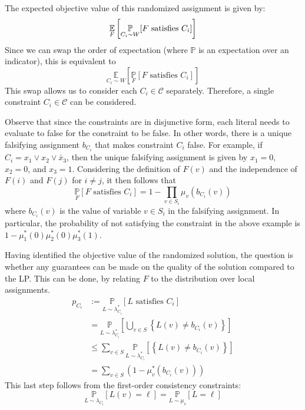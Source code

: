 The expected objective value of this randomized assignment is given by:
\[
	\underset{F}{\mathbb{E}}\left[ \underset{C_i \sim W}{\mathbb{P}}[ F \text{ satisfies } C_i] \right]
\]
Since we can swap the order of expectation (where $\mathbb{P}$ is an expectation over an indicator), this is equivalent to
\[
\underset{C_i \sim W}{\mathbb{E}}\left[ \underset{F}{\mathbb{P}}[ F \text{ satisfies } C_i] \right]
\]
This swap allows us to consider each $C_i \in \mathcal{C}$ separately. 
Therefore, a single constraint $C_i \in \mathcal{C}$ can be considered.

Observe that since the constraints are in disjunctive form, each literal needs to evaluate to false for the constraint to be false. 
In other words, there is a unique falsifying assignment $b_{C_i}$ that makes constraint $C_i$ false. 
For example, if $C_i = x_1 \vee x_2 \vee \bar{x}_3$, then the unique falsifying assignment is given by $x_1 = 0$, $x_2 = 0$, and $x_3 = 1$. 
Considering the definition of $F(v)$ and the independence of $F(i)$ and $F(j)$ for $i \neq j$, it then follows that 
\begin{equation}
		\underset{F}{\mathbb{P}}[ F \text{ satisfies } C_i] = 1 - \prod_{v \in S_i} \mu_v(b_{C_i}(v)) \label{eq:objectiveRounding}
\end{equation}
where $b_{C_i}(v)$ is the value of variable $v \in S_i$ in the falsifying assignment. 
In particular, the probability of not satisfying the constraint in the above example is $ 1- \mu_1^*(0) \mu_2^*(0) \mu_3^*(1)$.

Having identified the objective value of the randomized solution, the question is whether any guarantees can be made on the quality of the solution compared to the LP. 
This can be done, by relating $F$ to the distribution over local assignments.
\begin{align}
	p_{C_i} &:= \underset{L \sim \lambda_{C_i}^*}{\mathbb{P}} [L \text{ satisfies } C_i] \nonumber\\
			&=  \underset{L \sim \lambda_{C_i}^*}{\mathbb{P}}\left[ \bigcup_{v \in S} \left\{ L(v) \neq b_{C_i}(v) \right\} \right] \nonumber\\
			&\le \sum_{v \in  S } \underset{L \sim \lambda_{C_i}^*}{\mathbb{P}} \left[  \left\{ L(v) \neq b_{C_i}(v) \right\} \right] \nonumber\\
			&= \sum_{v \in S} \left( 1 - \mu_v^*(b_{C_i}(v)) \right) \label{eq:objectiveLP}
\end{align}
This last step follows from the first-order consistency constraints:
\[
	\underset{L \sim \lambda_{C_i} }{\mathbb{P}}[ L(v) = \ell] = \underset{L \sim \mu_v }{\mathbb{P}}[ L = \ell]
\]

